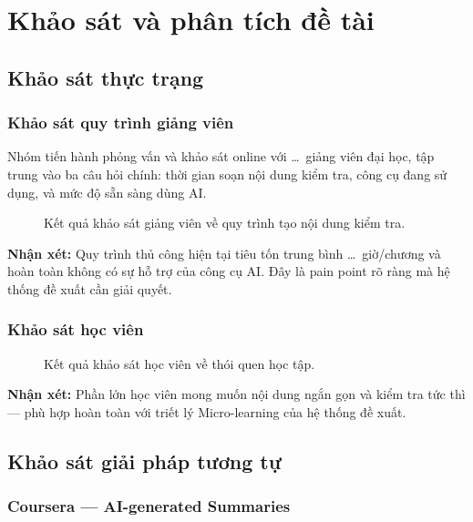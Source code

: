 \section{Khảo sát và phân tích đề tài}

\subsection{Khảo sát thực trạng}

\subsubsection{Khảo sát quy trình giảng viên}

Nhóm tiến hành phỏng vấn và khảo sát online với \ldots\ giảng viên đại học,
tập trung vào ba câu hỏi chính: thời gian soạn nội dung kiểm tra, công cụ
đang sử dụng, và mức độ sẵn sàng dùng AI.

\begin{figure}[H]
    \centering
    \caption{Kết quả khảo sát giảng viên về quy trình tạo nội dung kiểm tra.}
    \label{fig:survey-instructor}
\end{figure}

\textbf{Nhận xét:} Quy trình thủ công hiện tại tiêu tốn trung bình
\ldots\ giờ/chương và hoàn toàn không có sự hỗ trợ của công cụ AI.
Đây là pain point rõ ràng mà hệ thống đề xuất cần giải quyết.

\subsubsection{Khảo sát học viên}

\begin{figure}[H]
    \centering
    \caption{Kết quả khảo sát học viên về thói quen học tập.}
    \label{fig:survey-learner}
\end{figure}

\textbf{Nhận xét:} Phần lớn học viên mong muốn nội dung ngắn gọn và kiểm tra
tức thì --- phù hợp hoàn toàn với triết lý Micro-learning của hệ thống đề xuất.

\subsection{Khảo sát giải pháp tương tự}

\subsubsection{Coursera --- AI-generated Summaries}

